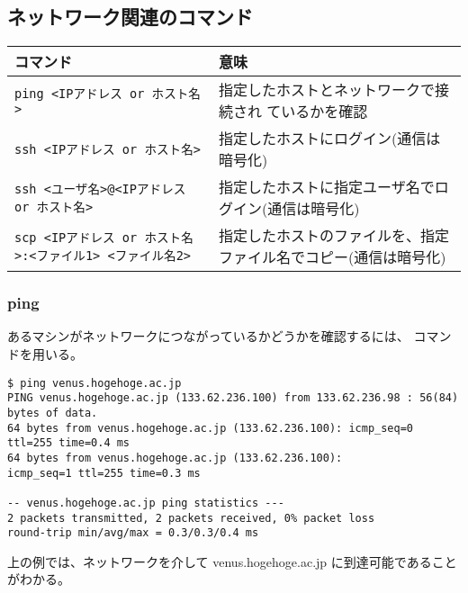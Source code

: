 \documentclass{jreport}
\begin{document}
\subsection{ネットワーク関連のコマンド}

{\small
\begin{tabular}[t]{lp{6cm}}\hline
コマンド & 意味 \\ \hline
\verb|ping <IPアドレス or ホスト名>| & 指定したホストとネットワークで接続され
ているかを確認 \\
\verb|ssh <IPアドレス or ホスト名>| & 指定したホストにログイン(通信は暗号化)
\\
\verb|ssh <ユーザ名>@<IPアドレス or ホスト名>| &
指定したホストに指定ユーザ名でログイン(通信は暗号化)
\\
\verb|scp <IPアドレス or ホスト名>:<ファイル1> <ファイル名2>|&
指定したホストのファイルを、指定ファイル名でコピー(通信は暗号化)
\\
\hline
\end{tabular}}

\subsubsection{ping}
あるマシンがネットワークにつながっているかどうかを確認するには、
 コマンドを用いる。
\begin{screen}
\begin{verbatim}
$ ping venus.hogehoge.ac.jp
PING venus.hogehoge.ac.jp (133.62.236.100) from 133.62.236.98 : 56(84) bytes of data.
64 bytes from venus.hogehoge.ac.jp (133.62.236.100): icmp_seq=0 ttl=255 time=0.4 ms
64 bytes from venus.hogehoge.ac.jp (133.62.236.100):
icmp_seq=1 ttl=255 time=0.3 ms

-- venus.hogehoge.ac.jp ping statistics ---
2 packets transmitted, 2 packets received, 0% packet loss
round-trip min/avg/max = 0.3/0.3/0.4 ms
\end{verbatim}
\end{screen}
上の例では、ネットワークを介して venus.hogehoge.ac.jp に到達可能であることがわかる。
\end{document}
